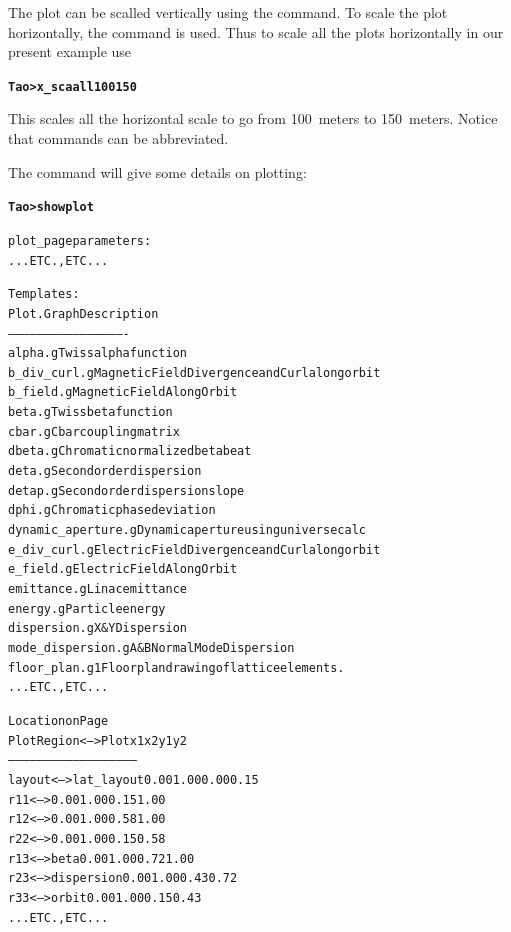 \documentclass{hitec}
\newcommand{\BF}[1]{{\normalfont\textbf{#1}}}
\newenvironment{display}
  {\vspace*{-1.5ex} \begin{alltt}}
  {\end{alltt} \vspace*{-1.0ex}}
\begin{document}
The plot can be scalled vertically using the  command. To scale the plot horizontally, 
the command  is used. Thus to scale all the plots horizontally in our present example use
\begin{display}
  \BF{Tao> x_sca all 100 150}
\end{display}
This scales all the horizontal scale to go from 100~meters to 150~meters.  Notice that
commands can be abbreviated.

The  command will give some details on plotting:
\begin{display}
  \BF{Tao> show plot}

    plot_page parameters:
    ... ETC., ETC ...

  Templates:
     Plot                  .Graph   Description
     --------------------  -------- -------------------
     alpha                 .g       Twiss alpha function
     b_div_curl            .g       Magnetic Field Divergence and Curl along orbit
     b_field               .g       Magnetic Field Along Orbit
     beta                  .g       Twiss beta function
     cbar                  .g       Cbar coupling matrix
     dbeta                 .g       Chromatic normalized beta beat
     deta                  .g       Second order dispersion
     detap                 .g       Second order dispersion slope
     dphi                  .g       Chromatic phase deviation
     dynamic_aperture      .g       Dynamic aperture using universe calc
     e_div_curl            .g       Electric Field Divergence and Curl along orbit
     e_field               .g       Electric Field Along Orbit
     emittance             .g       Linac emittance
     energy                .g       Particle energy
     dispersion            .g       X & Y Dispersion
     mode_dispersion       .g       A & B Normal Mode Dispersion
     floor_plan            .g1      Floor plan drawing of lattice elements.
    ... ETC., ETC ...

                                                 Location on Page
  Plot Region         <-->  Plot                 x1    x2    y1    y2
  -----------               -----------------------------------------
  layout              <-->  lat_layout          0.00  1.00  0.00  0.15
  r11                 <-->                      0.00  1.00  0.15  1.00
  r12                 <-->                      0.00  1.00  0.58  1.00
  r22                 <-->                      0.00  1.00  0.15  0.58
  r13                 <-->  beta                0.00  1.00  0.72  1.00
  r23                 <-->  dispersion          0.00  1.00  0.43  0.72
  r33                 <-->  orbit               0.00  1.00  0.15  0.43
    ... ETC., ETC ...
\end{display}
\end{document}
